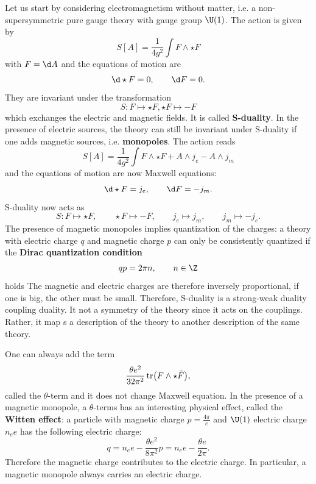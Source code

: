 \documentclass{worksheetclass}
\renewcommand{\emph}{\textbf}
\begin{document}
    Let us start by considering electromagnetism without matter, i.e. a non-supersymmetric pure gauge theory with gauge group $\U(1)$. The action is given by
    \begin{equation}
        S[A]=\frac{1}{4g^2}\int F\wedge\star F
    \end{equation}
    with $F=\d A$ and the equations of motion are
    \begin{equation}
        \d\star F=0,\qquad \d F=0.
    \end{equation}
    They are invariant under the transformation
    \begin{equation}
        S:F\mapsto\star F,\star F\mapsto-F
    \end{equation}
    which exchanges the electric and magnetic fields. It is called \emph{S-duality}. In the presence of electric sources, the theory can still be invariant under S-duality if one adds magnetic sources, i.e. \emph{monopoles}. The action reads
    \begin{equation}
        S[A]=\frac{1}{4g^2}\int F\wedge\star F+A\wedge j_e-A\wedge j_m
    \end{equation}
    and the equations of motion are now Maxwell equations:
    \begin{equation}
        \d\star F=j_e,\qquad \d F=-j_m.
    \end{equation}
    S-duality now acts as
    \begin{equation}
        S:F\mapsto\star F,\qquad \star F\mapsto-F,\qquad j_e\mapsto j_m,\qquad j_m\mapsto-j_e.
    \end{equation}
    The presence of magnetic monopoles implies quantization of the charges: a theory with electric charge $q$ and magnetic charge $p$ can only be consistently quantized if the \emph{Dirac quantization condition}
    \begin{equation}
        qp=2\pi n,\qquad n\in\Z
    \end{equation}
    holds The magnetic and electric charges are therefore inversely proportional, if one is big, the other must be small. Therefore, S-duality is a strong-weak duality coupling duality. It not a symmetry of the theory since it acts on the couplings. Rather, it map s a description of the theory to another description of the same theory.

    One can always add the term
    \begin{equation}
        \frac{\theta e^2}{32\pi^2}\tr(F\wedge\star\tilde{F}),
    \end{equation}
    called the $\theta$-term and it does not change Maxwell equation. In the presence of a magnetic monopole, a $\theta$-terms has an interesting physical effect, called the \emph{Witten effect}: a particle with magnetic charge $p=\frac{4\pi}{e}$ and $\U(1)$ electric charge $n_ee$ has the following electric charge:
    \begin{equation}
        q = n_ee-\frac{\theta e^2}{8\pi^2}p=n_ee-\frac{\theta e}{2\pi}.
    \end{equation}
    Therefore the magnetic charge contributes to the electric charge. In particular, a magnetic monopole always carries an electric charge.
\end{document}
